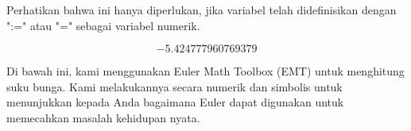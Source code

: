 \documentclass{article}
\begin{document}
\begin{eulernotebook}
\begin{eulercomment}
\begin{eulercomment}
\begin{eulercomment}
\begin{eulercomment}
\begin{eulercomment}
\begin{eulercomment}
\begin{eulercomment}
Perhatikan bahwa ini hanya diperlukan, jika variabel telah
didefinisikan dengan ":=" atau "=" sebagai variabel numerik.
\end{eulercomment}
\begin{eulerformula}
\[
-5.424777960769379
\]
\end{eulerformula}
\begin{eulercomment}
\begin{eulercomment}
\begin{eulercomment}
Di bawah ini, kami menggunakan Euler Math Toolbox (EMT) untuk
menghitung suku bunga. Kami melakukannya secara numerik dan simbolis
untuk menunjukkan kepada Anda bagaimana Euler dapat digunakan untuk
memecahkan masalah kehidupan nyata.


\end{eulercomment}
\end{eulercomment}
\end{eulercomment}
\end{eulercomment}
\end{eulercomment}
\end{eulercomment}
\end{eulercomment}
\end{eulercomment}
\end{eulercomment}
\end{eulernotebook}
\end{document}
